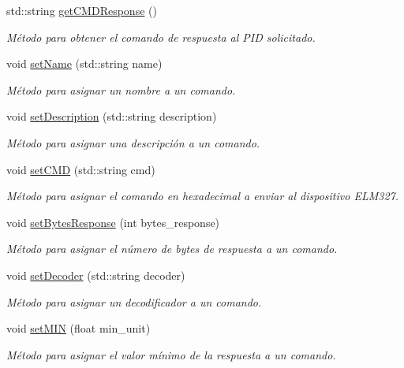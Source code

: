\begin{DoxyCompactItemize}
std\+::string \hyperlink{classCommands_ab4806a2fda5c80e10ab4446faa1e39b5}{get\+C\+M\+D\+Response} ()
\begin{DoxyCompactList}\small\item\em Método para obtener el comando de respuesta al P\+ID solicitado. \end{DoxyCompactList}\item 
void \hyperlink{classCommands_a8fd31a6ed848078dd67bf7ae303cfb9b}{set\+Name} (std\+::string name)
\begin{DoxyCompactList}\small\item\em Método para asignar un nombre a un comando. \end{DoxyCompactList}\item 
void \hyperlink{classCommands_aa430824877071f732b1a9aa9ff1bbf94}{set\+Description} (std\+::string description)
\begin{DoxyCompactList}\small\item\em Método para asignar una descripción a un comando. \end{DoxyCompactList}\item 
void \hyperlink{classCommands_a8ef86479788a98de99cc6ad6a78da9a4}{set\+C\+MD} (std\+::string cmd)
\begin{DoxyCompactList}\small\item\em Método para asignar el comando en hexadecimal a enviar al dispositivo E\+L\+M327. \end{DoxyCompactList}\item 
void \hyperlink{classCommands_a77c946b91fa3f3b7dbdc51ea1cc8208a}{set\+Bytes\+Response} (int bytes\+\_\+response)
\begin{DoxyCompactList}\small\item\em Método para asignar el número de bytes de respuesta a un comando. \end{DoxyCompactList}\item 
void \hyperlink{classCommands_acf92f3f0134534808bf6dcfb4496cf97}{set\+Decoder} (std\+::string decoder)
\begin{DoxyCompactList}\small\item\em Método para asignar un decodificador a un comando. \end{DoxyCompactList}\item 
void \hyperlink{classCommands_a073788fa37adc5fc91d3a40b869b8e67}{set\+M\+IN} (float min\+\_\+unit)
\begin{DoxyCompactList}\small\item\em Método para asignar el valor mínimo de la respuesta a un comando. \end{DoxyCompactList}\item 

\end{DoxyCompactItemize}
